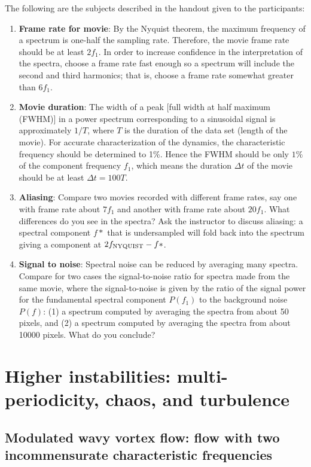 \documentclass[%
 amsmath,amssymb,
 aps,
floatfix,
aps,prd,longbibliography,
notitlepage
]{revtex4-1}
\begin{document}
The following are the subjects described in the handout given to the participants:
\begin{enumerate}

\item {\bf Frame rate for movie}:  By the Nyquist theorem, the maximum frequency of a spectrum is one-half the sampling rate. Therefore, the movie frame rate should be at least $2f_1$. In order to increase confidence in the interpretation of the spectra, choose a frame rate fast enough so a spectrum will include the second and third harmonics; that is, choose a frame rate somewhat greater than $6f_1$.

\item {\bf Movie duration}:  The width of a peak [full width at half maximum (FWHM)] in a power spectrum corresponding to a sinusoidal signal is approximately $1/T$, where $T$ is the duration of the data set (length of the movie).  For accurate characterization of the dynamics, the characteristic frequency should be determined to 1\%. Hence the FWHM should be only $1\%$ of the component frequency $f_1$, which means the duration $\Delta t$ of the movie should be at least $\Delta t=100T$.  
\item {\bf Aliasing}:   Compare two movies recorded with different frame rates, say one with frame rate about $7f_1$ and another with frame rate about $20f_1$.  What differences do you see in the spectra?  Ask the instructor to discuss aliasing:  a spectral component $f*$ that is undersampled will fold back into the spectrum giving a component at  $2f_{\rm NYQUIST} - f*$.


\item {\bf Signal to noise}:  Spectral noise can be reduced by averaging many spectra.  Compare for two cases the signal-to-noise ratio for spectra made from the same movie, where the signal-to-noise is given by the ratio of the signal power for the fundamental spectral component $P(f_1)$  to the background noise $P(f)$:  (1) a spectrum computed by averaging the spectra from about 50 pixels, and (2) a spectrum computed by averaging the spectra from about 10000 pixels.  What do you conclude?

\end{enumerate}

\section{Higher instabilities:  multi-periodicity, chaos, and turbulence} 
\subsection{Modulated wavy vortex flow: flow with two incommensurate characteristic frequencies}
\end{document}
